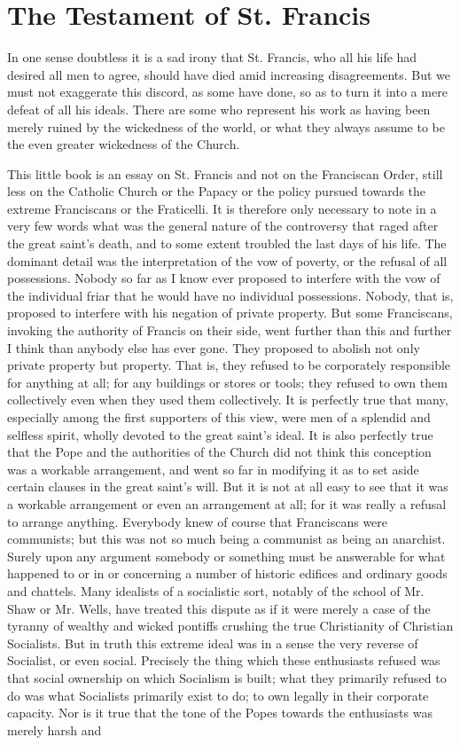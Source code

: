 \documentclass{book}
\begin{document}
\chapter{The Testament of St. Francis}
\label{chapter-9}
In one sense doubtless it is a sad irony that St. Francis, who all his life had desired all men to agree, should have died amid increasing disagreements. But we must not exaggerate this discord, as some have done, so as to turn it into a mere defeat of all his ideals. There are some who represent his work as having been merely ruined by the wickedness of the world, or what they always assume to be the even greater wickedness of the Church.

This little book is an essay on St. Francis and not on the Franciscan Order, still less on the Catholic Church or the Papacy or the policy pursued towards the extreme Franciscans or the Fraticelli. It is therefore only necessary to note in a very few words what was the general nature of the controversy that raged after the great saint’s death, and to some extent troubled the last days of his life. The dominant detail was the interpretation of the vow of poverty, or the refusal of all possessions. Nobody so far as I know ever proposed to interfere with the vow of the individual friar that he would have no individual possessions. Nobody, that is, proposed to interfere with his negation of private property. But some Franciscans, invoking the authority of Francis on their side, went further than this and further I think than anybody else has ever gone. They proposed to abolish not only private property but property. That is, they refused to be corporately responsible for anything at all; for any buildings or stores or tools; they refused to own them collectively even when they used them collectively. It is perfectly true that many, especially among the first supporters of this view, were men of a splendid and selfless spirit, wholly devoted to the great saint’s ideal. It is also perfectly true that the Pope and the authorities of the Church did not think this conception was a workable arrangement, and went so far in modifying it as to set aside certain clauses in the great saint’s will. But it is not at all easy to see that it was a workable arrangement or even an arrangement at all; for it was really a refusal to arrange anything. Everybody knew of course that Franciscans were communists; but this was not so much being a communist as being an anarchist. Surely upon any argument somebody or something must be answerable for what happened to or in or concerning a number of historic edifices and ordinary goods and chattels. Many idealists of a socialistic sort, notably of the school of Mr. Shaw or Mr. Wells, have treated this dispute as if it were merely a case of the tyranny of wealthy and wicked pontiffs crushing the true Christianity of Christian Socialists. But in truth this extreme ideal was in a sense the very reverse of Socialist, or even social. Precisely the thing which these enthusiasts refused was that social ownership on which Socialism is built; what they primarily refused to do was what Socialists primarily exist to do; to own legally in their corporate capacity. Nor is it true that the tone of the Popes towards the enthusiasts was merely harsh and 
\end{document}
